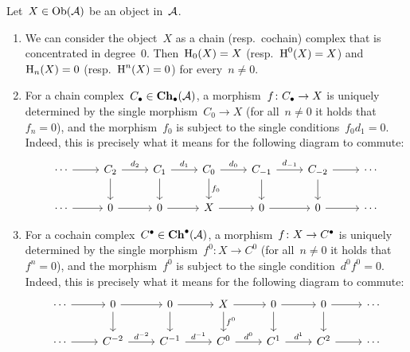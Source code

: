 \begin{remark}
  Let~$X \in \operatorname{Ob}(\mathcal{A})$ be an object in~$\mathcal{A}$.
  \begin{enumerate}
    \item
      We can consider the object~$X$ as a chain (resp.\ cochain) complex that is concentrated in degree~$0$.
      Then~$\operatorname{H}_0(X) = X$ (resp.\ $\operatorname{H}^0(X) = X$) and~$\operatorname{H}_n(X) = 0$ (resp.\ $\operatorname{H}^n(X) = 0$) for every~$n \neq 0$.
    \item
      For a chain complex~$C_\bullet \in \mathbf{Ch}_\bullet(\mathcal{A})$, a morphism~$f \colon C_\bullet \to X$ is uniquely determined by the single morphism~$C_0 \to X$ (for all~$n \neq 0$ it holds that~$f_n = 0$), and the morphism~$f_0$ is subject to the single conditions~$f_0 d_1 = 0$.
      Indeed, this is precisely what it means for the following diagram to commute:
      \[
        \begin{tikzcd}
            \dotsb
            \arrow{r}
          & C_2
            \arrow{r}[above]{d_2}
            \arrow{d}
          & C_1
            \arrow{r}[above]{d_1}
            \arrow{d}
          & C_0
            \arrow{r}[above]{d_0}
            \arrow{d}[right]{f_0}
          & C_{-1}
            \arrow{r}[above]{d_{-1}}
            \arrow{d}
          & C_{-2}
            \arrow{r}
            \arrow{d}
          & \dotsb
          \\
            \dotsb
            \arrow{r}
          & 0
            \arrow{r}
          & 0
            \arrow{r}
          & X
            \arrow{r}
          & 0
            \arrow{r}
          & 0
            \arrow{r}
          & \dotsb
        \end{tikzcd}
      \]
    \item
      For a cochain complex~$C^\bullet \in \mathbf{Ch}^\bullet(\mathcal{A})$, a morphism~$f \colon X \to C^\bullet$ is uniquely determined by the single morphism~$f^0 \colon X \to C^0$ (for all~$n \neq 0$ it holds that~$f^n = 0$), and the morphism~$f^0$ is subject to the single condition~$d^0 f^0 = 0$.
      Indeed, this is precisely what it means for the following diagram to commute:
      \[
        \begin{tikzcd}
            \dotsb
            \arrow{r}
          & 0
            \arrow{r}
            \arrow{d}
          & 0
            \arrow{r}
            \arrow{d}
          & X
            \arrow{r}
            \arrow{d}[right]{f^0}
          & 0
            \arrow{r}
            \arrow{d}
          & 0
            \arrow{r}
            \arrow{d}
          & \dotsb
          \\
            \dotsb
            \arrow{r}
          & C^{-2}
            \arrow{r}[above]{d^{-2}}
          & C^{-1}
            \arrow{r}[above]{d^{-1}}
          & C^0
            \arrow{r}[above]{d^0}
          & C^1
            \arrow{r}[above]{d^1}
          & C^2
            \arrow{r}
          & \dotsb
        \end{tikzcd}
      \]
  \end{enumerate}
\end{remark}


